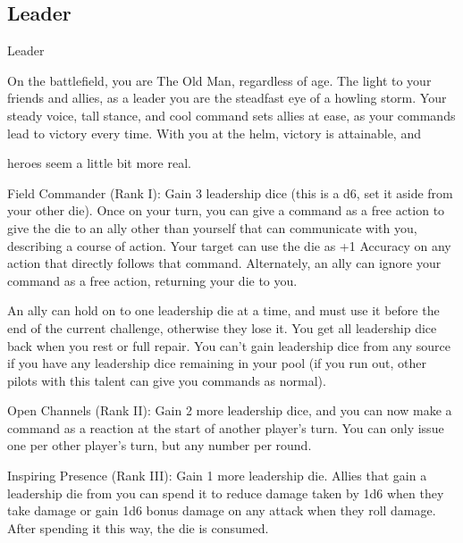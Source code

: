 \subsection{Leader}

                                                    Leader  

On the battlefield, you are The Old Man, regardless of age. The light to your friends and allies, as a leader  
you are the steadfast eye of a howling storm. Your steady voice, tall stance, and cool command sets allies  
at ease, as your commands lead to victory every time. With you at the helm, victory is attainable, and  

heroes seem a little bit more real.   

                                                                                                                


Field Commander (Rank I): Gain 3 leadership dice (this is a d6, set it aside from your other die).  
Once on your turn, you can give a command as a free action to give the die to an ally other than  
yourself that can communicate with you, describing a course of action. Your target can use the  
die as +1 Accuracy on any action that directly follows that command. Alternately, an ally can  
ignore your command as a free action, returning your die to you. 
 
An ally can hold on to one leadership die at a time, and must use it before the end of the current  
challenge, otherwise they lose it. You get all leadership dice back when you rest or full repair. You  
can’t gain leadership dice from any source if you have any leadership dice remaining in your pool  
(if you run out, other pilots with this talent can give you commands as normal).
 
Open Channels (Rank II): Gain 2 more leadership dice, and you can now make a command as a  
reaction at the start of another player’s turn. You can only issue one per other player’s turn, but  
any number per round.
 
Inspiring Presence (Rank III): Gain 1 more leadership die. Allies that gain a leadership die from  
you can spend it to reduce damage taken by 1d6 when they take damage or gain 1d6 bonus  
damage on any attack when they roll damage. After spending it this way, the die is consumed.
 